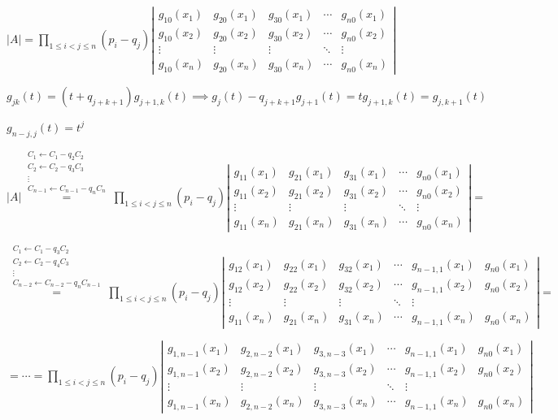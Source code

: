 \documentclass{article}
\begin{document}
$|A| = \prod_{1 \leq i < j \leq n} (p_i - q_j) \left|\begin{matrix}g_{10}(x_1) & g_{20}(x_1) & g_{30}(x_1) & \cdots & g_{n0}(x_1) \\ g_{10}(x_2) & g_{20}(x_2) & g_{30}(x_2) & \cdots & g_{n0}(x_2) \\ \vdots & \vdots & \vdots & \ddots & \vdots \\ g_{10}(x_n) & g_{20}(x_n) & g_{30}(x_n) & \cdots & g_{n0}(x_n) \end{matrix}\right|$

$g_{jk}(t) = (t + q_{j+k+1})g_{j+1,k}(t) \implies g_j(t) - q_{j+k+1}g_{j+1}(t) = tg_{j+1,k}(t) = g_{j, k + 1}(t)$

$g_{n-j,j}(t) = t^{j}$

$|A| \overset{\substack{C_{1} \leftarrow C_{1} - q_{2}C_{2} \\ C_{2} \leftarrow C_{2} - q_{3}C_{3} \\ \vdots \\ C_{n-1} \leftarrow C_{n-1} - q_{n}C_{n} }}{=} \prod_{1 \leq i < j \leq n} (p_i - q_j) \left|\begin{matrix}g_{11}(x_1) & g_{21}(x_1) & g_{31}(x_1) & \cdots & g_{n0}(x_1) \\ g_{11}(x_2) & g_{21}(x_2) & g_{31}(x_2) & \cdots & g_{n0}(x_2) \\ \vdots & \vdots & \vdots & \ddots & \vdots \\ g_{11}(x_n) & g_{21}(x_n) & g_{31}(x_n) & \cdots & g_{n0}(x_n) \end{matrix}\right| =$

$\overset{\substack{C_{1} \leftarrow C_{1} - q_{3}C_{2} \\ C_{2} \leftarrow C_{2} - q_{4}C_{3} \\ \vdots \\ C_{n-2} \leftarrow C_{n-2} - q_{n}C_{n-1} }}{=} \prod_{1 \leq i < j \leq n} (p_i - q_j) \left|\begin{matrix}g_{12}(x_1) & g_{22}(x_1) & g_{32}(x_1) & \cdots & g_{n-1,1}(x_1) & g_{n0}(x_1) \\ g_{12}(x_2) & g_{22}(x_2) & g_{32}(x_2) & \cdots & g_{n-1,1}(x_2) & g_{n0}(x_2) \\ \vdots & \vdots & \vdots & \ddots & \vdots \\ g_{11}(x_n) & g_{21}(x_n) & g_{31}(x_n) & \cdots & g_{n-1,1}(x_n) & g_{n0}(x_n) \end{matrix}\right| =$

$= \cdots = \prod_{1 \leq i < j \leq n} (p_i - q_j) \left|\begin{matrix}g_{1,n-1}(x_1) & g_{2,n-2}(x_1) & g_{3,n-3}(x_1) & \cdots & g_{n-1,1}(x_1) & g_{n0}(x_1) \\ g_{1,n-1}(x_2) & g_{2,n-2}(x_2) & g_{3,n-3}(x_2) & \cdots & g_{n-1,1}(x_2) & g_{n0}(x_2) \\ \vdots & \vdots & \vdots & \ddots & \vdots \\ g_{1,n-1}(x_n) & g_{2,n-2}(x_n) & g_{3,n-3}(x_n) & \cdots & g_{n-1,1}(x_n) & g_{n0}(x_n) \end{matrix}\right|$
\end{document}
